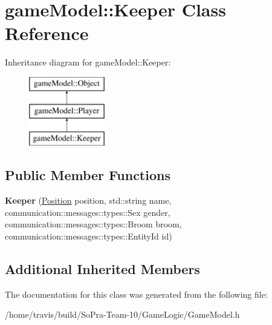 \hypertarget{classgame_model_1_1_keeper}{\section{game\-Model\-:\-:Keeper Class Reference}
\label{classgame_model_1_1_keeper}
}
Inheritance diagram for game\-Model\-:\-:Keeper\-:\begin{figure}[H]
\begin{center}
\leavevmode
\includegraphics[height=3.000000cm]{classgame_model_1_1_keeper}
\end{center}
\end{figure}
\subsection*{Public Member Functions}
\begin{DoxyCompactItemize}
\item 
\hypertarget{classgame_model_1_1_keeper_ad35a2ca0aee3f986e6287973b7786a88}{{\bfseries Keeper} (\hyperlink{structgame_model_1_1_position}{Position} position, std\-::string name, communication\-::messages\-::types\-::\-Sex gender, communication\-::messages\-::types\-::\-Broom broom, communication\-::messages\-::types\-::\-Entity\-Id id)}\label{classgame_model_1_1_keeper_ad35a2ca0aee3f986e6287973b7786a88}

\end{DoxyCompactItemize}
\subsection*{Additional Inherited Members}


The documentation for this class was generated from the following file\-:\begin{DoxyCompactItemize}
\item 
/home/travis/build/\-So\-Pra-\/\-Team-\/10/\-Game\-Logic/Game\-Model.\-h\end{DoxyCompactItemize}
